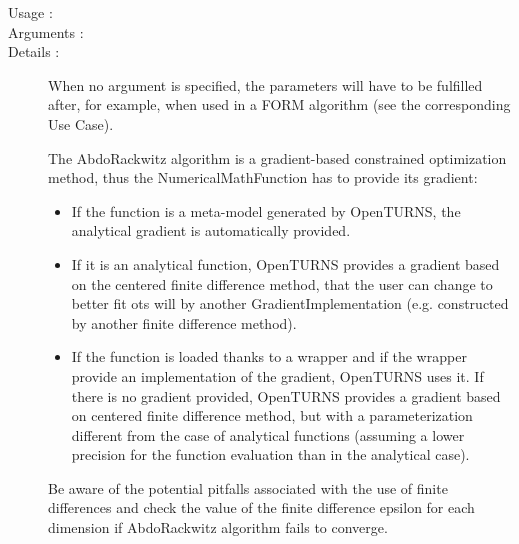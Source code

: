 \begin{description}
\item[Usage :] \rule{0pt}{1em}

\item[Arguments :]  \rule{0pt}{1em}

\item[Details :]  When no argument is specified, the parameters will have to be fulfilled after, for example, when used in a FORM algorithm (see the corresponding Use Case).

  The AbdoRackwitz algorithm is a gradient-based constrained optimization method, thus the NumericalMathFunction has to provide its gradient:
  \begin{itemize}
  \item If the function is a meta-model generated by OpenTURNS, the analytical gradient is automatically provided.
  \item If it is an analytical function, OpenTURNS provides a gradient based on the centered finite difference method, that the user can change to better fit ots will by another GradientImplementation (e.g. constructed by another finite difference method).
  \item If the function is loaded thanks to a wrapper and if the wrapper provide an implementation of the gradient, OpenTURNS uses it. If there is no gradient provided, OpenTURNS provides a gradient based on centered finite difference method, but with a parameterization different from the case of analytical functions (assuming a lower precision for the function evaluation than in the analytical case).
  \end{itemize}
  Be aware of the potential pitfalls associated with the use of finite differences and check the value of the finite difference epsilon for each dimension if AbdoRackwitz algorithm fails to converge.


\end{description}
